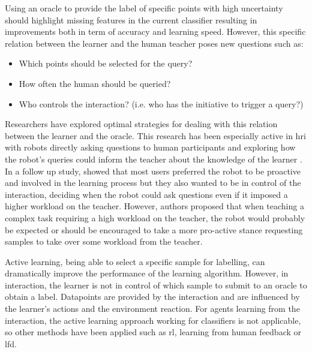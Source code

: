 Using an oracle to provide the label of specific points with high uncertainty should highlight missing features in the current classifier resulting in improvements both in term of accuracy and learning speed. However, this specific relation between the learner and the human teacher poses new questions such as: 
\begin{itemize}
	\item Which points should be selected for the query?
	\item How often the human should be queried?
	\item Who controls the interaction? (i.e. who has the initiative to trigger a query?)
\end{itemize}

Researchers have explored optimal strategies for dealing with this relation between the learner and the oracle. This research has been especially active in \gls{hri} with robots directly asking questions to human participants and exploring how the robot's queries could inform the teacher about the knowledge of the learner \citep{chao2010transparent}. In a follow up study, \cite{cakmak2010designing} showed that most users preferred the robot to be proactive and involved in the learning process but they also wanted to be in control of the interaction, deciding when the robot could ask questions even if it imposed a higher workload on the teacher. However, authors proposed that when teaching a complex task requiring a high workload on the teacher, the robot would probably be expected or should be encouraged to take a more pro-active stance requesting samples to take over some workload from the teacher.

Active learning, being able to select a specific sample for labelling, can dramatically improve the performance of the learning algorithm. However, in interaction, the learner is not in control of which sample to submit to an oracle to obtain a label. Datapoints are provided by the interaction and are influenced by the learner's actions and the environment reaction. For agents learning from the interaction, the active learning approach working for classifiers is not applicable, so other methods have been applied such as \gls{rl}, learning from human feedback or \gls{lfd}.

